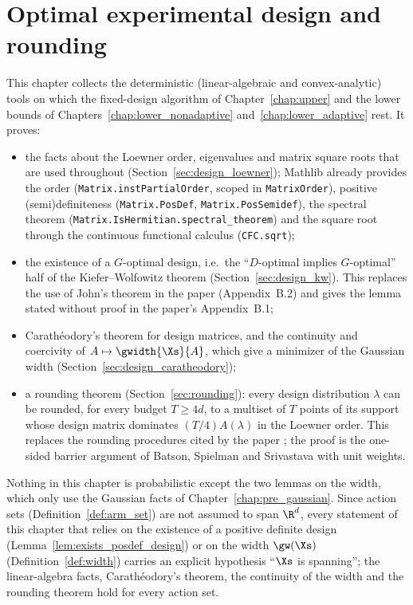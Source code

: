 \chapter{Optimal experimental design and rounding}
\label{chap:design}

This chapter collects the deterministic (linear-algebraic and convex-analytic) tools on which
the fixed-design algorithm of Chapter~\ref{chap:upper} and the lower bounds of
Chapters~\ref{chap:lower_nonadaptive} and~\ref{chap:lower_adaptive} rest. It proves:
\begin{itemize}
  \item the facts about the Loewner order, eigenvalues and matrix square roots that are used
        throughout (Section~\ref{sec:design_loewner}); Mathlib already provides the order
        (\texttt{Matrix.instPartialOrder}, scoped in \texttt{MatrixOrder}), positive
        (semi)definiteness (\texttt{Matrix.PosDef}, \texttt{Matrix.PosSemidef}), the spectral
        theorem (\texttt{Matrix.IsHermitian.spectral\_theorem}) and the square root through the
        continuous functional calculus (\texttt{CFC.sqrt});
  \item the existence of a $G$-optimal design, i.e.\ the ``$D$-optimal implies $G$-optimal''
        half of the Kiefer--Wolfowitz theorem (Section~\ref{sec:design_kw}). This replaces the
        use of John's theorem in the paper (Appendix~B.2) and gives the lemma stated without
        proof in the paper's Appendix~B.1;
  \item Carath\'eodory's theorem for design matrices, and the continuity and coercivity of
        $A \mapsto \gwidth{\Xs}{A}$, which give a minimizer of the Gaussian width
        (Section~\ref{sec:design_caratheodory});
  \item a rounding theorem (Section~\ref{sec:rounding}): every design distribution $\lambda$ can
        be rounded, for every budget $T \ge 4d$, to a multiset of $T$ points of its support whose
        design matrix dominates $(T/4)A(\lambda)$ in the Loewner order. This replaces the rounding
        procedures cited by the paper \cite{katz2020empirical,allen2021near}; the proof is the
        one-sided barrier argument of Batson, Spielman and Srivastava \cite{batson2012twice}
        with unit weights.
\end{itemize}
Nothing in this chapter is probabilistic except the two lemmas on the width, which only use
the Gaussian facts of Chapter~\ref{chap:pre_gaussian}. Since action sets
(Definition~\ref{def:arm_set}) are not assumed to span $\R^d$, every statement of this chapter
that relies on the existence of a positive definite design
(Lemma~\ref{lem:exists_posdef_design}) or on the width $\gw(\Xs)$ (Definition~\ref{def:width})
carries an explicit hypothesis ``$\Xs$ is spanning''; the linear-algebra facts,
Carath\'eodory's theorem, the continuity of the width and the rounding theorem hold for every
action set.

